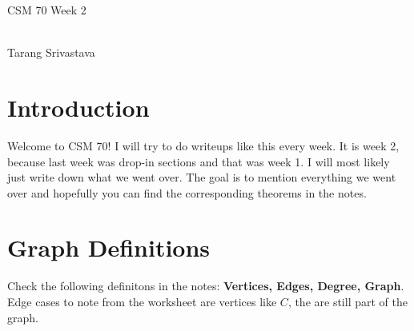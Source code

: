 \documentclass[10pt, twocolumn]{article}
\author{Tarang Srivastava}
\newcommand{\makechaptertitle}[1]{
\begin{center}
	\begin{large}
		#1
	\end{large}
	\begin{small}
		\\Tarang Srivastava
	\end{small}
\end{center}
}
\theoremstyle{definition}
\theoremstyle{definition}
\begin{document}
\makechaptertitle{CSM 70 Week 2}

\section{Introduction}
    Welcome to CSM 70! I will try to do writeups like this every week. 
    It is week 2, because last week was drop-in sections and that was week 1.
    I will most likely just write down what we went over. 
    The goal is to mention everything we went over and hopefully you can find the corresponding theorems in the notes. 
\section{Graph Definitions}
Check the following definitons in the notes: \textbf{Vertices, Edges, Degree, Graph}. 
Edge cases to note from the worksheet are vertices like $ C $, the are still part of the graph.
\section{}
\end{document}
